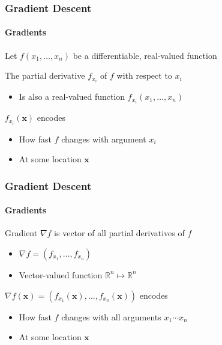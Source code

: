 \documentclass[xetex,professionalfont]{beamer}
\renewcommand\emph[1]{\textcolor{tuwcvl_cvl_blue}{#1}}
\newcommand{\RR}{\mathbb{R}}
\renewcommand{\vec}[1]{\ensuremath{\mathbf{#1}}}
\newcommand{\vx}{\vec{x}}
\begin{document}
\begin{frame}
  \frametitle{Gradient Descent}
  \framesubtitle{Gradients}

Let $f(x_1,\dots,x_n)$ be a differentiable, real-valued function

\bigskip

The \emph{partial derivative} $f_{x_i}$ of $f$ with respect to $x_i$
\begin{itemize}
    \item Is also a real-valued function $f_{x_i}(x_1,\dots,x_n)$
\end{itemize}

\bigskip

$f_{x_i}(\vx)$ encodes
\begin{itemize}
    \item How fast $f$ changes with argument $x_i$
    \item At some location $\vx$
\end{itemize}

\end{frame}


\begin{frame}
  \frametitle{Gradient Descent}
  \framesubtitle{Gradients}

\emph{Gradient} $\nabla f$ is vector of all partial derivatives of $f$
\begin{itemize}
    \item $\nabla f=\left(f_{x_1},\dots,f_{x_n}\right)$
    \item Vector-valued function $\RR^n\mapsto\RR^n$
\end{itemize}

\bigskip

$\nabla f(\vx)=(f_{x_1}(\vx),\dots,f_{x_n}(\vx))$ encodes
\begin{itemize}
    \item How fast $f$ changes with all arguments $x_1\cdots x_n$
    \item At some location $\vx$
\end{itemize}

\end{frame}
\end{document}
